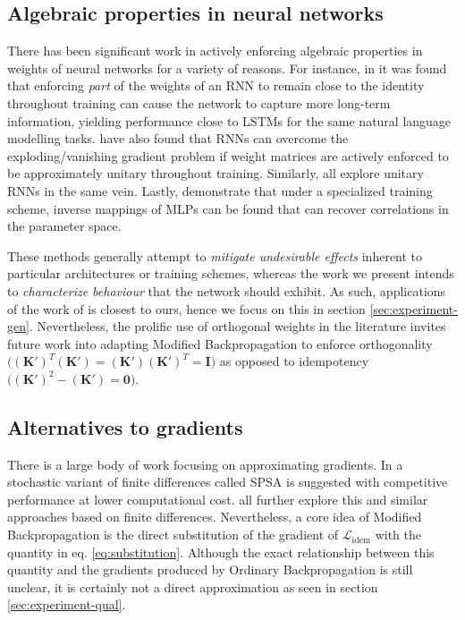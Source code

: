 \documentclass{article}
\theoremstyle{plain}
\theoremstyle{definition}
\theoremstyle{remark}
\newcommand{\vI}{\mathbf{I}}
\newcommand{\vK}{\mathbf{K}}
\begin{document}

\subsection*{Algebraic properties in neural networks}
There has been significant work in actively enforcing algebraic properties in weights of neural networks for a variety of reasons. For instance, in \citealt{mikolov-rnn,le-rnn-relu} it was found that enforcing \textit{part} of the weights of an RNN to remain close to the identity throughout training can cause the network to capture more long-term information, yielding performance close to LSTMs for the same natural language modelling tasks. \citealt{arjovsky-rnn} have also found that RNNs can overcome the exploding/vanishing gradient problem if weight matrices are actively enforced to be approximately unitary throughout training. Similarly, \citealt{saxe-isometry,kiani-projunn,jing-tunable-unn} all explore unitary RNNs in the same vein. Lastly, \citealt{ardizzone-inv} demonstrate that under a specialized training scheme, inverse mappings of MLPs can be found that can recover correlations in the parameter space.

These methods generally attempt to \textit{mitigate undesirable effects} inherent to particular architectures or training schemes, whereas the work we present intends to \textit{characterize behaviour} that the network should exhibit. As such, applications of the work of \citealt{shocher-ign} is closest to ours, hence we focus on this in section \ref{sec:experiment-gen}. Nevertheless, the prolific use of orthogonal weights in the literature invites future work into adapting Modified Backpropagation to enforce orthogonality $\big((\vK')^T(\vK')=(\vK')(\vK')^T=\vI\big)$ as opposed to idempotency $\big((\vK')^2 - (\vK') = \bm{0}\big)$.


\subsection*{Alternatives to gradients}
There is a large body of work focusing on approximating gradients. In \citealt{spall-perturb} a stochastic variant of finite differences called SPSA is suggested with competitive performance at lower computational cost. \citealt{scheinberg-approx,do-approx,bandler-approx} all further explore this and similar approaches based on finite differences. Nevertheless, a core idea of Modified Backpropagation is the direct substitution of the gradient of $\mathcal{L}_{\mathrm{idem}}$ with the quantity in eq. \ref{eq:substitution}. Although the exact relationship between this quantity and the gradients produced by Ordinary Backpropagation is still unclear, it is certainly not a direct approximation as seen in section \ref{sec:experiment-qual}.
\end{document}
